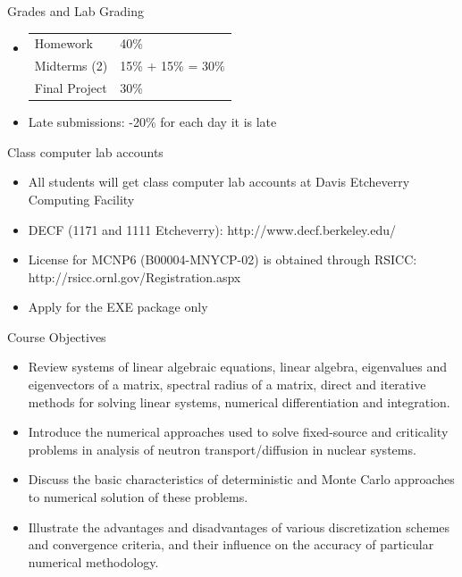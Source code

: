 \documentclass[xcolor=x11names,compress]{beamer}
\renewcommand{\(}{\begin{columns}}
\renewcommand{\)}{\end{columns}}
\newcommand{\<}[1]{\begin{column}{#1}}
\renewcommand{\>}{\end{column}}
\begin{document}
\begin{frame}{Grades and Lab}
Grading
\begin{itemize}
\item \begin{tabular}{ll}
Homework & 40\% \\
Midterms (2) & 15\% + 15\% = 30\% \\
Final Project & 30\% 
\end{tabular}
\item Late submissions: -20\% for each day it is late
\end{itemize}
Class computer lab accounts
\begin{itemize}
\item All students will get class computer lab accounts at Davis Etcheverry Computing Facility
\item DECF (1171 and 1111 Etcheverry): http://www.decf.berkeley.edu/
\item License for MCNP6 (B00004-MNYCP-02) is obtained through RSICC: http://rsicc.ornl.gov/Registration.aspx
\item Apply for the EXE package only
\end{itemize}
\end{frame}

\begin{frame}{Course Objectives}
\begin{itemize}
\item Review systems of linear algebraic equations, linear algebra, eigenvalues and eigenvectors of a matrix, spectral radius of a matrix, direct and iterative methods for solving linear systems, numerical differentiation and integration.
\item Introduce the numerical approaches used to solve fixed-source and criticality problems in analysis of neutron transport/diffusion in nuclear systems.
\item Discuss the basic characteristics of deterministic and Monte Carlo approaches to numerical solution of these problems.
\item Illustrate the advantages and disadvantages of various discretization schemes and convergence criteria, and their influence on the accuracy of particular numerical methodology.
\end{itemize}
\end{frame}
\end{document}
